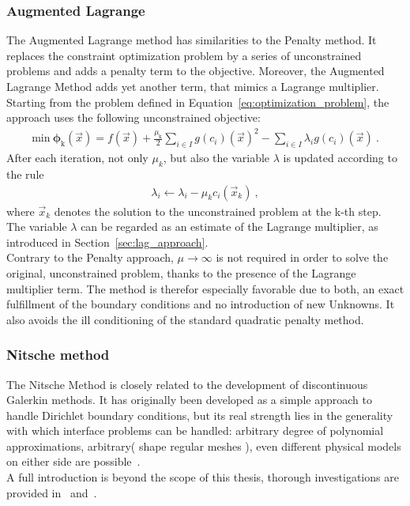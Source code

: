 \subsubsection{Augmented Lagrange}
The Augmented Lagrange method has similarities to the Penalty method. It replaces the constraint optimization problem by a series of unconstrained problems and adds a penalty term to the objective. Moreover, the Augmented Lagrange Method adds yet another term, that mimics a Lagrange multiplier.\\
Starting from the problem defined in Equation~\eqref{eq:optimization_problem}, the approach uses the following unconstrained objective:
\begin{align}
  \mathrm{min}~\boldsymbol{\phi}_\mathrm{k}(\vec{x})=f(\vec{x})+\frac{\mu_\mathrm{k}}{2} \sum_{i\in I} g(c_i)(\vec{x})^2 - \sum_{i\in I} \lambda_i g(c_i)(\vec{x})~. 
\end{align}
After each iteration, not only $\mu_k$, but also the variable $\lambda$ is updated according to the rule
\begin{align}
  \lambda_i \leftarrow \lambda_i-\mu_k c_i(\vec{x}_k)~, 
\end{align}
where $\vec{x}_k$ denotes the solution to the unconstrained problem at the k-th step.\\
The variable $\lambda$ can be regarded as an estimate of the Lagrange multiplier, as introduced in Section~\ref{sec:lag_approach}.\\
Contrary to the Penalty approach, $\mu \rightarrow \infty$ is not required in order to solve the original, unconstrained problem, thanks to the presence of the Lagrange multiplier term. The method is therefor especially favorable due to both, an exact fulfillment of the boundary conditions and no introduction of new Unknowns. It also avoids the ill conditioning of the standard quadratic penalty method.
\subsubsection{Nitsche method}\label{sec:nitsche_method}
The Nitsche Method is closely related to the development of discontinuous Galerkin methods. It has originally been developed as a simple approach to handle Dirichlet boundary conditions, but its real strength lies in the generality with which interface problems can be handled: arbitrary degree of polynomial approximations, arbitrary( shape regular meshes ), even different physical models on either side are possible~\cite{Hansbo2005}.\\
A full introduction is beyond the  scope of this thesis, thorough investigations are provided in~\cite{Nitsche1971} and~\cite{Hansbo2005}.\\